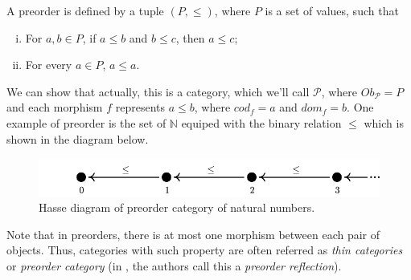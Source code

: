 \begin{example}[Preorders]
  A preorder is defined by a tuple $(P, \leq)$, where $P$ is a set of values, such that
  \begin{enumerate}[(i)]
    \item For $a,b \in P$, if $a\leq b$ and $b \leq c$, then $a \leq c$;
    \item For every $a \in P$, $a \leq a$.
  \end{enumerate}
  We can show that actually, this is a category, which we'll call $\mathcal P$,
  where $Ob_\mathcal P = P$ and each morphism $f$ represents $a \leq b$, where
  $cod_f = a$ and $dom_f = b$.
  One example of preorder is the set of $\mathbb N$ equiped with the binary relation $\leq$
  which is shown in the diagram below.

\begin{figure}[H]
  \begin{center}
    \includegraphics{./notebooks/NCat}
  \end{center}
  \caption{Hasse diagram of preorder category of natural numbers.}
  \label{fig:NCat}
\end{figure}
\end{example}

Note that in preorders, there is at most one morphism between each pair of objects.
Thus, categories with such property are often referred as \textit{thin categories}
or \textit{preorder category} (in \citet{fong2019invitation}, the authors call this
a \textit{preorder reflection}).

